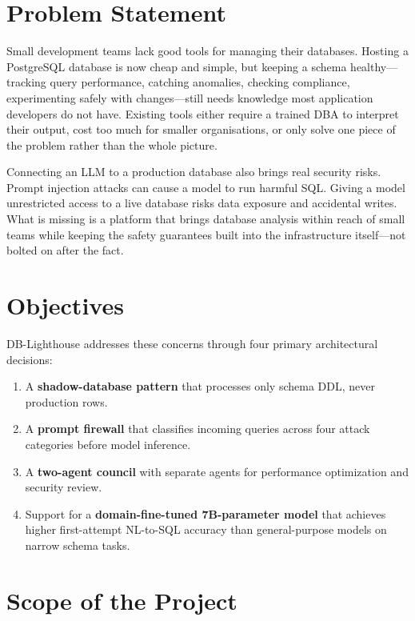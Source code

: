 \documentclass[12pt,a4paper]{report}
\begin{document}
\section{Problem Statement}

Small development teams lack good tools for managing their databases. Hosting a PostgreSQL database is now cheap and simple, but keeping a schema healthy---tracking query performance, catching anomalies, checking compliance, experimenting safely with changes---still needs knowledge most application developers do not have. Existing tools either require a trained DBA to interpret their output, cost too much for smaller organisations, or only solve one piece of the problem rather than the whole picture.

Connecting an LLM to a production database also brings real security risks. Prompt injection attacks can cause a model to run harmful SQL. Giving a model unrestricted access to a live database risks data exposure and accidental writes. What is missing is a platform that brings database analysis within reach of small teams while keeping the safety guarantees built into the infrastructure itself---not bolted on after the fact.

\section{Objectives}

DB-Lighthouse addresses these concerns through four primary architectural decisions:

\begin{enumerate}
    \item A \textbf{shadow-database pattern} that processes only schema DDL, never production rows.
    \item A \textbf{prompt firewall} that classifies incoming queries across four attack categories before model inference.
    \item A \textbf{two-agent council} with separate agents for performance optimization and security review.
    \item Support for a \textbf{domain-fine-tuned 7B-parameter model} that achieves higher first-attempt NL-to-SQL accuracy than general-purpose models on narrow schema tasks.
\end{enumerate}

\section{Scope of the Project}
\end{document}
